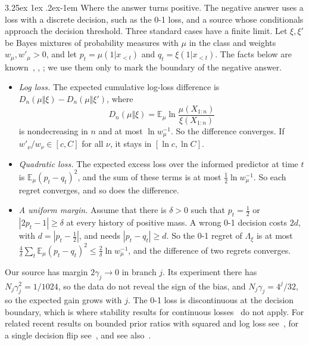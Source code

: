 \documentclass[11pt]{article}
\makeatletter
\renewcommand\paragraph{\@startsection{paragraph}{4}{\z@}%
  {3.25ex \@plus1ex \@minus.2ex}{-1em}%
  {\normalfont\normalsize\bfseries\boldmath}}
\newcommand{\E}{\mathbb{E}}
\theoremstyle{definition}
\theoremstyle{remark}
\makeatother
\begin{document}
\paragraph{Where the answer turns positive.}
The negative answer uses a loss with a discrete decision, such as the 0-1
loss, and a source whose conditionals approach the decision threshold. Three standard cases have a finite limit. Let $\xi,\xi'$ be
Bayes mixtures of probability measures with $\mu$ in the class and weights
$w_\mu,w'_\mu>0$, and let $p_t=\mu(1|x_{<t})$ and $q_t=\xi(1|x_{<t})$. The
facts below are known~\cite[Ch.~3]{hutter2005uai},
\cite{solomonoff1978,hutter2003tit}, \cite[p.~988]{hutter2003jmlr}; we use
them only to mark the boundary of the negative answer.
\begin{itemize}
\item \emph{Log loss.} The expected cumulative log-loss difference is
$D_n(\mu\Vert\xi)-D_n(\mu\Vert\xi')$, where
\[
D_n(\mu\Vert\xi)=\E_\mu\ln\frac{\mu(X_{1:n})}{\xi(X_{1:n})}
\]
is nondecreasing in
$n$ and at most $\ln w_\mu^{-1}$. So the difference converges. If
$w'_\nu/w_\nu\in[c,C]$ for all $\nu$, it stays in $[\ln c,\ln C]$.
\item \emph{Quadratic loss.} The expected excess loss over the informed
predictor at time $t$ is $\E_\mu(p_t-q_t)^2$, and the sum of these terms is at
most $\frac12\ln w_\mu^{-1}$. So each regret converges, and so does the
difference.
\item \emph{A uniform margin.} Assume that there is $\delta>0$ such that
$p_t=\frac12$ or $|2p_t-1|\ge\delta$ at every history of positive mass. A wrong
0-1 decision costs $2d$, with $d=|p_t-\frac12|$, and needs $|p_t-q_t|\ge d$.
So the 0-1 regret of $\Lambda_\xi$ is at most
$\frac4\delta\sum_t\E_\mu(p_t-q_t)^2\le\frac2\delta\ln w_\mu^{-1}$, and the
difference of two regrets converges.
\end{itemize}
Our source has margin $2\gamma_j\to0$ in branch $j$. Its experiment there has
$N_j\gamma_j^2=1/1024$, so the data do not reveal the sign of the bias, and
$N_j\gamma_j=4^j/32$, so the expected gain grows with $j$. The 0-1 loss is discontinuous at the decision boundary, which is
where stability results for continuous losses~\cite{kadanechuang1978} do not
apply. For related recent results on bounded prior ratios with squared and log
loss see~\cite[Thm.~5]{liteng2026}, for a single decision flip
see~\cite[Ex.~5]{suwandi2026}, and see also~\cite[Prop.~4]{dawidvovk2009}.

\end{document}
